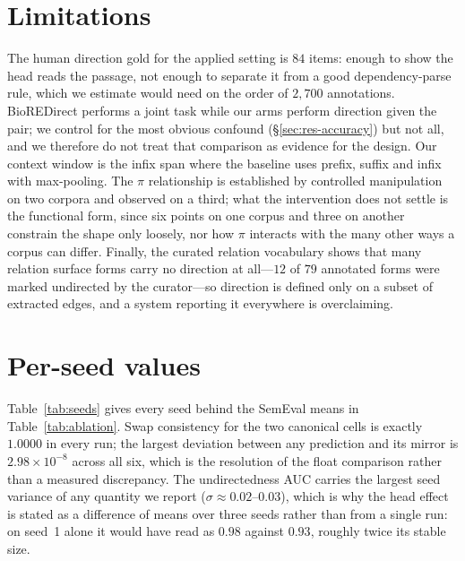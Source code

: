 \documentclass[11pt]{article}
\begin{document}
\section*{Limitations}
The human direction gold for the applied setting is $84$ items: enough to show the head reads
the passage, not enough to separate it from a good dependency-parse rule, which we estimate
would need on the order of $2{,}700$ annotations. BioREDirect performs a joint task while our
arms perform direction given the pair; we control for the most obvious confound
(\S\ref{sec:res-accuracy}) but not all, and we therefore do not treat that comparison as
evidence for the design. Our context window is the infix span where the baseline uses prefix,
suffix and infix with max-pooling. The $\pi$ relationship is established by controlled
manipulation on two corpora and observed on a third; what the intervention does not settle is
the functional form, since six points on one corpus and three on another constrain the shape
only loosely, nor how $\pi$ interacts with the many other ways a corpus can differ. Finally, the
curated relation vocabulary shows that many relation surface forms carry no direction at
all---$12$ of $79$ annotated forms were marked undirected by the curator---so direction is
defined only on a subset of extracted edges, and a system reporting it everywhere is
overclaiming.




\appendix

\section{Per-seed values}
\label{app:seeds}
Table~\ref{tab:seeds} gives every seed behind the SemEval means in
Table~\ref{tab:ablation}. Swap consistency for the two canonical cells is exactly $1.0000$ in
every run; the largest deviation between any prediction and its mirror is
$2.98\times10^{-8}$ across all six, which is the resolution of the float comparison rather
than a measured discrepancy. The undirectedness AUC carries the largest seed variance of any
quantity we report ($\sigma \approx 0.02$--$0.03$), which is why the head effect is stated as a
difference of means over three seeds rather than from a single run: on seed~1 alone it would
have read as $0.98$ against $0.93$, roughly twice its stable size.
\end{document}
